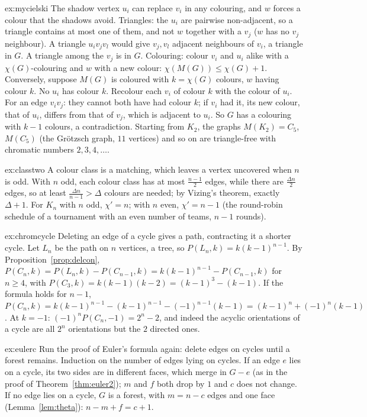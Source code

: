 \begin{solution}{ex:mycielski}
\idea The shadow vertex $u_i$ can replace $v_i$ in any colouring, and $w$ forces a colour that the shadows avoid.
\writeup Triangles: the $u_i$ are pairwise non-adjacent, so a triangle contains at most one of them, and not $w$ together with a $v_j$ ($w$ has no $v_j$ neighbour). A triangle $u_iv_jv_l$ would give
$v_j,v_l$ adjacent neighbours of $v_i$, a triangle in $G$. A triangle among the $v_j$ is in $G$. Colouring: colour $v_i$ and $u_i$ alike with a $\chi(G)$-colouring and $w$ with a new colour:
$\chi(M(G))\le\chi(G)+1$. Conversely, suppose $M(G)$ is coloured with $k=\chi(G)$ colours, $w$ having colour $k$. No $u_i$ has colour $k$. Recolour each $v_i$ of colour $k$ with the colour of $u_i$. For an
edge $v_iv_j$: they cannot both have had colour $k$; if $v_i$ had it, its new colour, that of $u_i$, differs from that of $v_j$, which is adjacent to $u_i$. So $G$ has a colouring with $k-1$
colours, a contradiction. Starting from $K_2$, the graphs $M(K_2)=C_5$, $M(C_5)$ (the Gr\"otzsch graph, $11$ vertices) and so on are triangle-free with chromatic numbers
$2,3,4,\dots$.
\end{solution}

\begin{solution}{ex:classtwo}
\idea A colour class is a matching, which leaves a vertex uncovered when $n$ is odd.
\writeup With $n$ odd, each colour class has at most $\frac{n-1}2$ edges, while there are $\frac{\Delta n}2$ edges, so at least $\frac{\Delta n}{n-1}>\Delta$ colours are needed; by Vizing's theorem,
exactly $\Delta+1$. For $K_n$ with $n$ odd, $\chi'=n$; with $n$ even, $\chi'=n-1$ (the round-robin schedule of a tournament with an even number of teams, $n-1$ rounds).
\end{solution}

\begin{solution}{ex:chromcycle}
\idea Deleting an edge of a cycle gives a path, contracting it a shorter cycle.
\writeup Let $L_n$ be the path on $n$ vertices, a tree, so $P(L_n,k)=k(k-1)^{n-1}$. By Proposition~\ref{prop:delcon}, $P(C_n,k)=P(L_n,k)-P(C_{n-1},k)=k(k-1)^{n-1}-P(C_{n-1},k)$ for $n\ge4$, with $P(C_3,k)=k(k-1)(k-2)=(k-1)^3-(k-1)$. If the
formula holds for $n-1$, $P(C_n,k)=k(k-1)^{n-1}-(k-1)^{n-1}-(-1)^{n-1}(k-1)=(k-1)^n+(-1)^n(k-1)$. At $k=-1$: $(-1)^nP(C_n,-1)=2^n-2$, and indeed the acyclic orientations of a
cycle are all $2^n$ orientations but the $2$ directed ones.
\end{solution}

\begin{solution}{ex:eulerc}
\idea Run the proof of Euler's formula again: delete edges on cycles until a forest remains.
\writeup Induction on the number of edges lying on cycles. If an edge $e$ lies on a cycle, its two sides are in different faces, which merge in $G-e$ (as in the proof
of Theorem~\ref{thm:euler2}); $m$ and $f$ both drop by $1$ and $c$ does not change. If no edge lies on a cycle, $G$ is a forest, with $m=n-c$ edges and one face
(Lemma~\ref{lem:theta}): $n-m+f=c+1$.
\end{solution}

